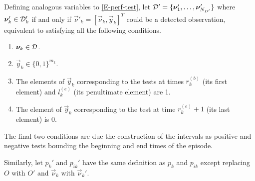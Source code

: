 \documentclass[thesis.tex]{subfiles}
\begin{document}
Defining analogous variables to \cref{E-perf-test}, let $\mathcal{D}' = \{ \bm{\nu}'_1, \dots, \bm{\nu}'_{N_{D'}} \}$ where $\bm{\nu}'_k \in \mathcal{D}'_k$ if and only if $\vec{\nu}'_k = [\vec{\nu}_k, \vec{y}_k]^T$ could be a detected observation, equivalent to satisfying all the following conditions.
\begin{enumerate}
  \item $\bm{\nu}_k \in \mathcal{D}$.
  \item $\vec{y}_k \in \{0, 1\}^{m_k}$.
  \item The elements of $\vec{y}_k$ corresponding to the tests at times $r_k^{(b)}$ (its first element) and $l_k^{(e)}$ (its penultimate element) are 1.
  \item The element of $\vec{y}_k$ corresponding to the test at time $r_k^{(e)} + 1$ (its last element) is 0.
\end{enumerate}
The final two conditions are due the construction of the intervals as positive and negative tests bounding the beginning and end times of the episode.

Similarly, let $p_k'$ and $p_{ik}'$ have the same definition as $p_k$ and $p_{ik}$ except replacing $O$ with $O'$ and $\vec{\nu}_k$ with $\vec{\nu}_k'$.
\end{document}
